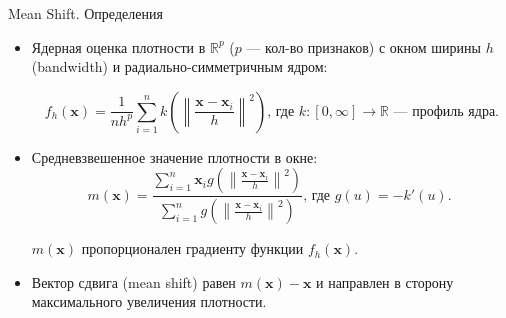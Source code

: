 \documentclass[unicode, notheorems, handout]{beamer}
\begin{document}







\begin{frame}{Mean Shift. Определения}
\small
\begin{itemize}
    \item Ядерная оценка плотности в $\mathbb{R}^p$ ($p$ --- кол-во признаков) с окном ширины $h$ (bandwidth) и радиально-симметричным ядром: 
    
    $$f_h(\pmb{x})=\frac{1}{n h^p}\sum_{i=1}^{n} k\left(\left\|\frac{\pmb{x}-\pmb{x}_i}{h}\right\|^2\right), \, \text{где $k:[0, \infty]\to \mathbb{R}$ — профиль ядра}. $$

    \item Средневзвешенное значение плотности в окне:
    $$m(\pmb{x})=\frac{\sum\limits_{i=1}^n \pmb{x}_i g\left(\left\|\frac{\pmb{x}-\pmb{x}_i}{h}\right\|^2\right)}{\sum\limits_{i=1}^n g\left(\left\|\frac{\pmb{x}-\pmb{x}_i}{h}\right\|^2\right)}, \, \text{где  $g(u)=-k'(u)$. }$$

    $m(\pmb{x})$ пропорционален градиенту функции $f_h(\pmb{x})$.

    \item Вектор сдвига  (mean shift) равен $m(\pmb{x})- \pmb{x}$ и направлен в сторону максимального увеличения плотности. 
\end{itemize}
\end{frame}
\end{document}

